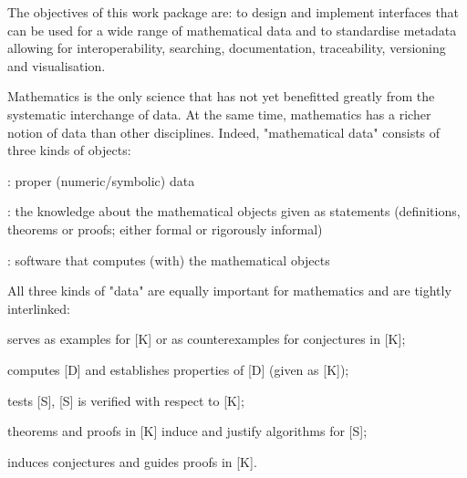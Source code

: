\begin{workpackage}[id=dksbases,wphases=1-48!.5,
  title=Data/Knowledge/Software-Bases,lead=JU,
  ZHRM=12,JURM=36,USHRM=12,UWRM=3,SARM=9]


\begin{wpobjectives}
The objectives of this work package are: to design and implement interfaces that can be used for a wide range of mathematical data and to standardise metadata allowing for interoperability, searching, documentation, traceability, versioning and visualisation.
\end{wpobjectives}


\begin{wpdescription}
Mathematics is the only science that has not yet benefitted greatly from the systematic interchange of data. At the same time, mathematics has a richer notion of data than other disciplines. 
Indeed, "mathematical data" consists of three kinds of objects:
\begin{compactitem}
\item[] [D]: proper (numeric/symbolic) data
\item[] [K]:  the knowledge about the mathematical objects given as statements (definitions, theorems or proofs; either formal or rigorously informal)
\item[] [S] : software that computes (with) the mathematical objects
\end{compactitem}

All three kinds of "data" are equally important for mathematics and are tightly interlinked:
\begin{compactitem}
\item[] [D] serves as examples for [K] or as counterexamples for conjectures in [K];
\item[] [S] computes [D] and establishes properties of [D] (given as [K]);
\item[] [D] tests [S], [S] is verified with respect to [K];
\item[] theorems and proofs in [K] induce and justify algorithms for [S];
\item[] [D] induces conjectures and guides proofs in [K].
\end{compactitem}


\end{wpdescription}
\end{workpackage}

